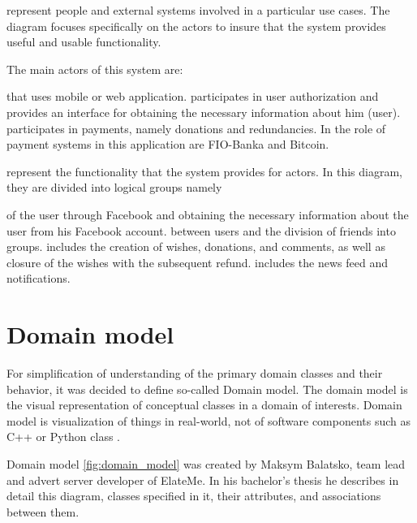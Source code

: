 \begin{itemize}
 represent people and external systems involved in a particular use cases. The diagram focuses
specifically on the actors to insure that the system provides useful and usable functionality.

The main actors of this system are:
\begin{itemize}
 that uses mobile or web application.
 participates in user authorization and provides an inter\-face for obtaining the necessary
information about him (user).
 participates in payments, namely donations and redundancies. In the role of payment systems in
this application are FIO-Banka and Bitcoin.
\end{itemize}

 represent the functionality that the system provides for actors. In this diagram, they are
divided into logical groups namely
\begin{itemize}
 of the user through Facebook and obtaining the necessary information about the user from his
Facebook account.
 between users and the division of friends into groups.
 includes the creation of wishes, donations, and comments, as well as closure of the wishes
with the subsequent refund.
 includes the news feed and notifications.
\end{itemize}

\end{itemize}


\section{Domain model}
For simplification of understanding of the primary domain classes and their behavior, it was decided to define so-called
Domain model. The domain model is the visual representation of conceptual classes in a domain of interests. Domain model
is visualization of things in real-world, not of software components such as C++ or Python class \cite{domainmodel}.

Domain model \ref{fig:domain_model} was created by Maksym Balatsko, team lead and advert server developer of ElateMe.
In his bachelor's thesis \cite{adserver} he describes in detail this diagram, classes specified in it, their attributes,
and associations between them.

